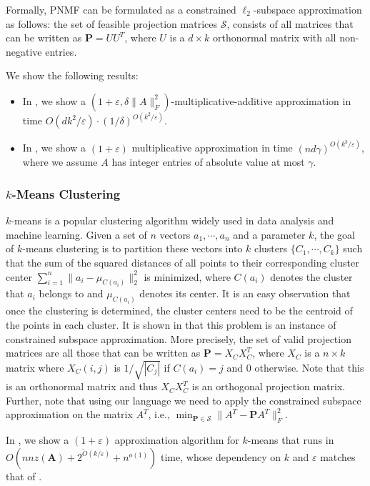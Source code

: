 \documentclass[11pt]{article}
\theoremstyle{plain}
\theoremstyle{plain}
\theoremstyle{definition}
\theoremstyle{plain}
\theoremstyle{remark}
\newcommand{\eps}{\varepsilon}
\begin{document}
Formally, PNMF can be formulated as a constrained $\ell_2$-subspace approximation as follows: the set of feasible projection matrices $\mathcal{S}$, consists of all matrices that can be written as $\bm{P} = UU^T$, where $U$ is a $d \times k$ orthonormal matrix with all non-negative entries.

We show the following results:
\begin{itemize}
    \item In , we show a $(1+\eps, \delta\|A\|_F^2)$-multiplicative-additive approximation in time $O(dk^2/\varepsilon)\cdot (1/\delta)^{O(k^2/\varepsilon)}$.
    \item In , we show a $(1+\varepsilon)$ multiplicative approximation in time $(nd\gamma)^{O(k^3/\varepsilon)}$, where we assume $A$ has integer entries of absolute value at most $\gamma$. 
\end{itemize}

\subsubsection{$k$-Means Clustering}
$k$-means is a popular clustering algorithm widely used in data analysis and machine learning. Given a set of $n$ vectors $a_1,\cdots,a_n$ and a parameter $k$, the goal of $k$-means clustering is to partition these vectors into $k$ clusters $\{C_1,\cdots,C_k\}$ such that the sum of the squared distances of all points to their corresponding cluster center $\sum_{i=1}^n \|a_i-\mu_{C(a_i)}\|_2^2$ is minimized, where $C(a_i)$ denotes the cluster that $a_i$ belongs to and $\mu_{C(a_i)}$ denotes its center. It is an easy observation that once the clustering is determined, the cluster centers need to be the centroid of the points in each cluster. It is shown in \cite{cohen2015dimensionality} 
that this problem is an instance of constrained subspace approximation. More precisely, the set of valid projection matrices are all those that can be written as ${\bm P} = X_CX_C^T$, where $X_C$ is a $n\times k$ matrix where $X_C(i,j)$ is $1/\sqrt{|C_j|}$ if $C(a_i)=j$ and $0$ otherwise. Note that this is an orthonormal matrix and thus $X_C X_C^T$ is an orthogonal projection matrix. Further, note that using our language we need to apply the constrained subspace approximation on the matrix $A^T$, i.e., $\min_{\bm{P} \in \mathcal{S}}\|A^T-\bm{P}A^T\|_F^2$.

In , we show a $(1+\eps)$ approximation algorithm for $k$-means that runs in $O(nnz(\bm{A})+ 2^{\widetilde{O}(k/\varepsilon)}+n^{o(1)})$ time,  whose dependency on $k$ and $\varepsilon$ matches that of \cite{feldman2007ptas}.
\end{document}
